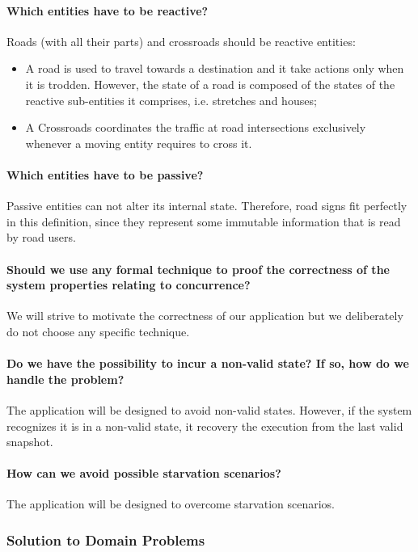 \paragraph{Which entities have to be reactive?} 
Roads (with all their parts) and crossroads should be reactive entities:
\begin{itemize}
  \item A road is used to travel towards a destination and it take actions only when it is trodden. 
  However, the state of a road is composed of the states 
  of the reactive sub-entities it comprises, i.e. stretches and houses;
  \item A Crossroads coordinates the traffic at road intersections 
  exclusively whenever a moving entity requires to cross it.
\end{itemize}

\paragraph{Which entities have to be passive?} 
Passive entities can not alter its internal state. 
Therefore, road signs fit perfectly in this definition, since
they represent some immutable information that is read by road users.

\paragraph{Should we use any formal technique to proof the correctness 
of the system properties relating to concurrence?} 
We will strive to motivate the correctness of our application 
but we deliberately do not choose any specific technique.

\paragraph{Do we have the possibility to incur a non-valid state? 
If so, how do we handle the problem?} 
The application will be designed to avoid non-valid states. 
However, if the system recognizes it is in a non-valid state, 
it recovery the execution from the last valid snapshot.

\paragraph{How can we avoid possible starvation scenarios?} 
The application will be designed to overcome starvation scenarios.

\subsubsection{Solution to Domain Problems}

